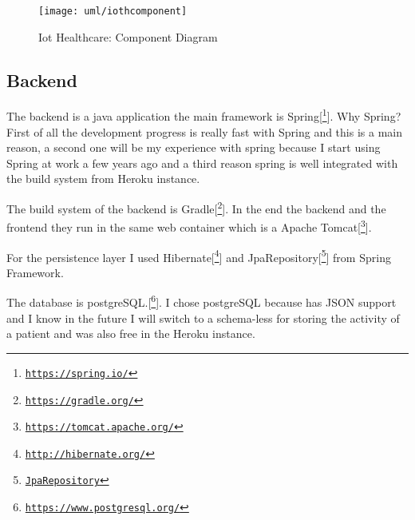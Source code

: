 \begin{figure}[h]
	\centering
	\texttt{[image: uml/iothcomponent]}
	\caption{Iot Healthcare: Component Diagram}
	\label{fig:iothcomponentdiagram5}
\end{figure}

\subsection{Backend}

The backend is a java application the main framework is Spring[\footnote{\href{https://spring.io/}{\texttt{https://spring.io/}}}].
Why Spring? First of all the development progress is really fast with Spring and this is a main reason, a second one will be my experience with spring because I start using Spring at work a few years ago and a third reason  spring is well integrated with the build system from Heroku instance.
\newline

The build system of the backend is Gradle[\footnote{\href{https://gradle.org/}{\texttt{https://gradle.org/}}}]. In the end the backend and the frontend they run in the same web container which is a Apache Tomcat[\footnote{\href{https://tomcat.apache.org/}{\texttt{https://tomcat.apache.org/}}}].
\newline

For the persistence layer I used Hibernate[\footnote{\href{http://hibernate.org/}{\texttt{http://hibernate.org/}}}] and JpaRepository[\footnote{\href{http://docs.spring.io/spring-data/jpa/docs/current/api/org/springframework/data/jpa/repository/JpaRepository.html}{\texttt{JpaRepository}}}] from Spring Framework.
\newline

The database is postgreSQL.[\footnote{\href{https://www.postgresql.org/}{\texttt{https://www.postgresql.org/}}}]. I chose postgreSQL because has JSON support and I know in the future I will switch to a schema-less for storing the activity of a patient and was also free in the Heroku instance.


